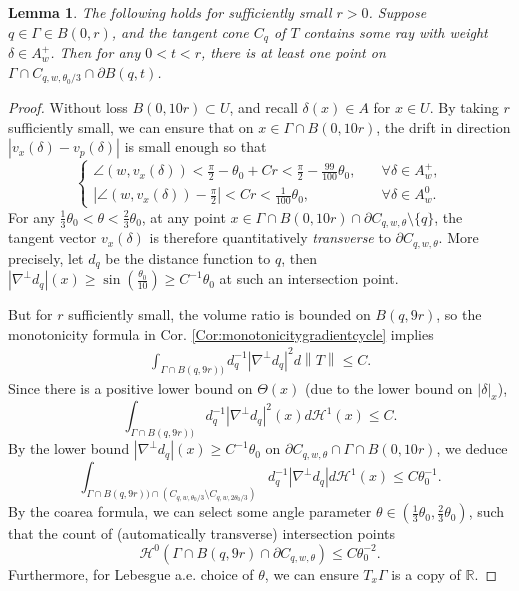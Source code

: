 \documentclass{article}
\newtheorem{lem}[thm]{Lemma}
\theoremstyle{definition}
\newcommand{\R}{\mathbb{R}}
\newcommand{\norm}[1]{\left\lVert#1\right\rVert}
\begin{document}
\begin{lem}\label{lem:cone}
The following holds for sufficiently small $r>0$. Suppose $q\in \Gamma\in B(0, r)$, and the tangent cone $C_q$ of $T$ contains some ray with weight $\delta\in A_w^+$. Then for any $0<t< r$, there is at least one point on $\Gamma\cap C_{q,w,\theta_0/3}\cap \partial B(q,t)$.





\end{lem}


			
			
\begin{proof}
	Without loss $B(0,10r)\subset U$, and recall  $\delta(x)\in A$ for $x\in U$. 
By taking $r$ sufficiently small, we can ensure that on $x\in \Gamma\cap B(0,10r)$, the drift in direction
$
| v_x(\delta)- v_p(\delta) |
$
is small enough so that
\[
\begin{cases}
	\angle (w, v_x(\delta) ) < \frac{\pi}{2}-  \theta_0+ Cr <  \frac{\pi}{2}- \frac{99}{100}\theta_0   ,\quad   & \forall \delta\in A_w^+,
	\\
	|\angle (w, v_x(\delta)) - \frac{\pi}{2} | <   Cr  <   \frac{1}{100}\theta_0        ,\quad   &  \forall \delta\in A_w^0.
\end{cases}
\]		
For any $\frac{1}{3}\theta_0   <\theta<\frac{2}{3}\theta_0$,
at any point $x\in \Gamma \cap B(0,10r)\cap \partial C_{q,w,\theta}\setminus \{ q\}$, the tangent vector $v_x(\delta)$ is therefore quantitatively \emph{transverse} to $\partial C_{q,w,\theta}$. More precisely, let $d_q$ be the distance function to $q$, then $|\nabla^\perp d_q|(x) \geq \sin ( \frac{\theta_0 }{10}  )\geq C^{-1}\theta_0$ at such an intersection point.



 But for $r$ sufficiently small,  the volume ratio is bounded on $B(q, 9r)$, so 
the monotonicity formula in Cor. \ref{Cor:monotonicitygradientcycle} implies
\[
\begin{split}
	\int_{    \Gamma \cap B(q, 9r) ) }  d_q^{-1} |\nabla^\perp d_q|^2  d\norm{ T} \leq  C.
\end{split}
\]
Since there is a positive lower bound on $\Theta(x)$ (due to the lower bound on $|\delta|_x$),
\[
	\int_{    \Gamma \cap B(q, 9r) ) }  d_q^{-1} |\nabla^\perp d_q|^2 (x) d\mathcal{H}^1(x) \leq  C.
\]
By the lower bound $|\nabla^\perp d_q|(x) \geq C^{-1}\theta_0$ on $\partial C_{q,w,\theta} \cap \Gamma \cap B(0,10r)$, we deduce
\[
\int_{    \Gamma \cap B(q, 9r) )  \cap (C_{q,w,\theta_0/3}\setminus C_{q,w,2\theta_0/3} ) }  d_q^{-1}  |\nabla^\perp d_q|   d\mathcal{H}^1(x) \leq  C\theta_0^{-1}.
\]
By the coarea formula, we can select some angle parameter $\theta\in ( \frac{1}{3}\theta_0, \frac{2}{3}\theta_0   )$, 
such that the count of (automatically transverse) intersection points
\begin{equation}\label{eqn:countingestimate}
\mathcal{H}^0(       \Gamma \cap B(q, 9r)  \cap \partial C_{q,w,\theta}     ) \leq C\theta_0^{-2}.
\end{equation}
Furthermore, for Lebesgue a.e. choice of $\theta$, we can ensure $T_x\Gamma$ is a copy of $\R$.





\end{proof}
\end{document}
